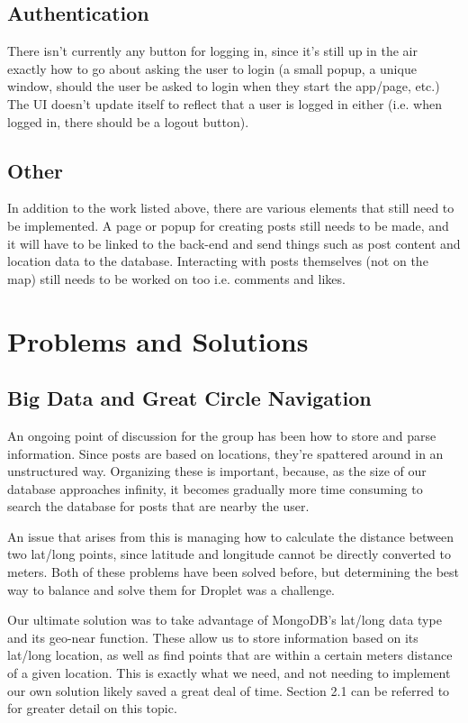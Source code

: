 \documentclass[draftclsnofoot, onecolumn, letterpaper,10pt,compsoc]{IEEEtran}
\begin{document}
\subsection{Authentication}
There isn't currently any button for logging in, since it's still up in the air exactly how to go about asking the user to login (a small popup, a unique window, should the user be asked to login when they start the app/page, etc.) The UI doesn't update itself to reflect that a user is logged in either (i.e. when logged in, there should be a logout button). 

\subsection{Other}
In addition to the work listed above, there are various elements that still need to be implemented. A page or popup for creating posts still needs to be made, and it will have to be linked to the back-end and send things such as post content and location data to the database. Interacting with posts themselves (not on the map) still needs to be worked on too i.e. comments and likes. 

\section{Problems and Solutions}

\subsection{Big Data and Great Circle Navigation}
An ongoing point of discussion for the group has been how to store and parse information. Since posts are based on locations, they're spattered around in an unstructured way. Organizing these is important, because, as the size of our database approaches infinity, it becomes gradually more time consuming to search the database for posts that are nearby the user. 

An issue that arises from this is managing how to calculate the distance between two lat/long points, since latitude and longitude cannot be directly converted to meters. Both of these problems have been solved before, but determining the best way to balance and solve them for Droplet was a challenge. 

Our ultimate solution was to take advantage of MongoDB's lat/long data type and its geo-near function. These allow us to store information based on its lat/long location, as well as find points that are within a certain meters distance of a given location. This is exactly what we need, and not needing to implement our own solution likely saved a great deal of time. Section 2.1 can be referred to for greater detail on this topic. 
\end{document}
